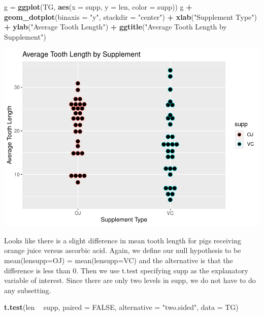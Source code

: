 \documentclass[
]{article}
\newenvironment{Shaded}{\begin{snugshade}}{\end{snugshade}}
\newcommand{\DataTypeTok}[1]{\textcolor[rgb]{0.13,0.29,0.53}{#1}}
\newcommand{\KeywordTok}[1]{\textcolor[rgb]{0.13,0.29,0.53}{\textbf{#1}}}
\newcommand{\NormalTok}[1]{#1}
\newcommand{\OperatorTok}[1]{\textcolor[rgb]{0.81,0.36,0.00}{\textbf{#1}}}
\newcommand{\OtherTok}[1]{\textcolor[rgb]{0.56,0.35,0.01}{#1}}
\newcommand{\StringTok}[1]{\textcolor[rgb]{0.31,0.60,0.02}{#1}}
\begin{document}
\begin{Shaded}
\begin{Highlighting}[]
\NormalTok{g =}\StringTok{ }\KeywordTok{ggplot}\NormalTok{(TG, }\KeywordTok{aes}\NormalTok{(}\DataTypeTok{x =}\NormalTok{ supp, }\DataTypeTok{y =}\NormalTok{ len, }\DataTypeTok{color =}\NormalTok{ supp))}
\NormalTok{g }\OperatorTok{+}\StringTok{ }\KeywordTok{geom_dotplot}\NormalTok{(}\DataTypeTok{binaxis =} \StringTok{"y"}\NormalTok{, }\DataTypeTok{stackdir =} \StringTok{"center"}\NormalTok{) }\OperatorTok{+}
\StringTok{  }\KeywordTok{xlab}\NormalTok{(}\StringTok{"Supplement Type"}\NormalTok{) }\OperatorTok{+}
\StringTok{  }\KeywordTok{ylab}\NormalTok{(}\StringTok{"Average Tooth Length"}\NormalTok{) }\OperatorTok{+}
\StringTok{  }\KeywordTok{ggtitle}\NormalTok{(}\StringTok{"Average Tooth Length by Supplement"}\NormalTok{)}
\end{Highlighting}
\end{Shaded}

\includegraphics{C6Project_files/figure-latex/groupsupp-1.pdf}

Looks like there is a slight difference in mean tooth length for pigs
receiving orange juice versus ascorbic acid. Again, we define our null
hypothesis to be mean(len\textbar supp=OJ) = mean(len\textbar supp=VC)
and the alternative is that the difference is less than 0. Then we use
t.test specifying supp as the explanatory variable of interest. Since
there are only two levels in supp, we do not have to do any subsetting.

\begin{Shaded}
\begin{Highlighting}[]
\KeywordTok{t.test}\NormalTok{(len }\OperatorTok{~}\StringTok{ }\NormalTok{supp, }\DataTypeTok{paired =} \OtherTok{FALSE}\NormalTok{, }\DataTypeTok{alternative =} \StringTok{"two.sided"}\NormalTok{, }\DataTypeTok{data =}\NormalTok{ TG)}
\end{Highlighting}
\end{Shaded}
\end{document}
